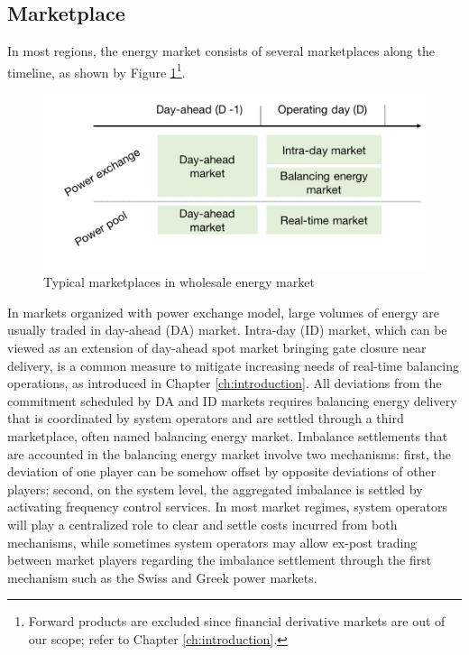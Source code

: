 \subsection{Marketplace}

In most regions, the energy market consists of several marketplaces along the timeline, as shown by Figure \ref{fig:energy-marketplaces}\footnote{Forward products are excluded since financial derivative markets are out of our scope; refer to Chapter \ref{ch:introduction}.}.

\begin{figure}[h!]
	\centering
	\includegraphics[width=0.95\linewidth]{Figures/EnergyMarketplaces}
	\caption{Typical marketplaces in wholesale energy market}
	\label{fig:energy-marketplaces}
\end{figure}

In markets organized with power exchange model, large volumes of energy are usually traded in day-ahead (DA) market. Intra-day (ID) market, which can be viewed as an extension of day-ahead spot market bringing gate closure near delivery, is a common measure to mitigate increasing needs of real-time balancing operations, as introduced in Chapter \ref{ch:introduction}. All deviations from the commitment scheduled by DA and ID markets requires balancing energy delivery that is coordinated by system operators and are settled through a third marketplace, often named balancing energy market. Imbalance settlements that are accounted in the balancing energy market involve two mechanisms: first, the deviation of one player can be somehow offset by opposite deviations of other players; second, on the system level, the aggregated imbalance is settled by activating frequency control services. In most market regimes, system operators will play a centralized role to clear and settle costs incurred from both mechanisms, while sometimes system operators may allow ex-post trading between market players regarding the imbalance settlement through the first mechanism such as the Swiss and Greek power markets.

